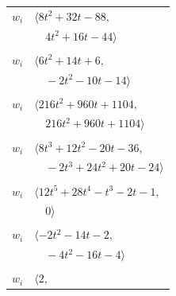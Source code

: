 \documentclass[11pt]{article}
\begin{document}
\begin{longtable}{@{}ll@{}}
$w_i$ & $\langle 8t^{2}+32t-88,$\\
 & $\quad 4t^{2}+16t-44\rangle$\\
\addlinespace[2pt]
\multicolumn{2}{@{}p{0.97\textwidth}@{}}{$i=19$, $D_i=1$, $\rho_{ij}$: $2{:}1, \allowbreak 11{:}1, \allowbreak 15{:}1, \allowbreak 25{:}2, \allowbreak 27{:}2, \allowbreak 28{:}1, \allowbreak 30{:}1$}\\
$w_i$ & $\langle 6t^{2}+14t+6,$\\
 & $\quad -2t^{2}-10t-14\rangle$\\
\addlinespace[2pt]
\multicolumn{2}{@{}p{0.97\textwidth}@{}}{$i=20$, $D_i=1$, $\rho_{ij}$: $11{:}1, \allowbreak 14{:}1, \allowbreak 15{:}2, \allowbreak 17{:}2, \allowbreak 22{:}1, \allowbreak 26{:}2, \allowbreak 28{:}1, \allowbreak 29{:}2, \allowbreak 31{:}2, \allowbreak 32{:}2, \allowbreak 33{:}2$}\\
$w_i$ & $\langle 216t^{2}+960t+1104,$\\
 & $\quad 216t^{2}+960t+1104\rangle$\\
\addlinespace[2pt]
\multicolumn{2}{@{}p{0.97\textwidth}@{}}{$i=21$, $D_i=1$, $\rho_{ij}$: $2{:}1, \allowbreak 3{:}2, \allowbreak 4{:}2, \allowbreak 18{:}1, \allowbreak 26{:}2, \allowbreak 28{:}2$}\\
$w_i$ & $\langle 8t^{3}+12t^{2}-20t-36,$\\
 & $\quad -2t^{3}+24t^{2}+20t-24\rangle$\\
\addlinespace[2pt]
\multicolumn{2}{@{}p{0.97\textwidth}@{}}{$i=22$, $D_i=1$, $\rho_{ij}$: $1{:}1, \allowbreak 3{:}2, \allowbreak 6{:}2, \allowbreak 10{:}2, \allowbreak 17{:}2, \allowbreak 18{:}2, \allowbreak 20{:}2, \allowbreak 23{:}2, \allowbreak 26{:}1, \allowbreak 29{:}1, \allowbreak 33{:}2$}\\
$w_i$ & $\langle 12t^{5}+28t^{4}-t^{3}-2t-1,$\\
 & $\quad 0\rangle$\\
\addlinespace[2pt]
\multicolumn{2}{@{}p{0.97\textwidth}@{}}{$i=23$, $D_i=1$, $\rho_{ij}$: $1{:}1, \allowbreak 2{:}2, \allowbreak 12{:}1, \allowbreak 16{:}2, \allowbreak 22{:}1, \allowbreak 32{:}2$}\\
$w_i$ & $\langle -2t^{2}-14t-2,$\\
 & $\quad -4t^{2}-16t-4\rangle$\\
\addlinespace[2pt]
\multicolumn{2}{@{}p{0.97\textwidth}@{}}{$i=24$, $D_i=1$, $\rho_{ij}$: $4{:}1, \allowbreak 7{:}1, \allowbreak 25{:}1, \allowbreak 27{:}1$}\\
$w_i$ & $\langle 2,$\\

\end{longtable}
\end{document}
